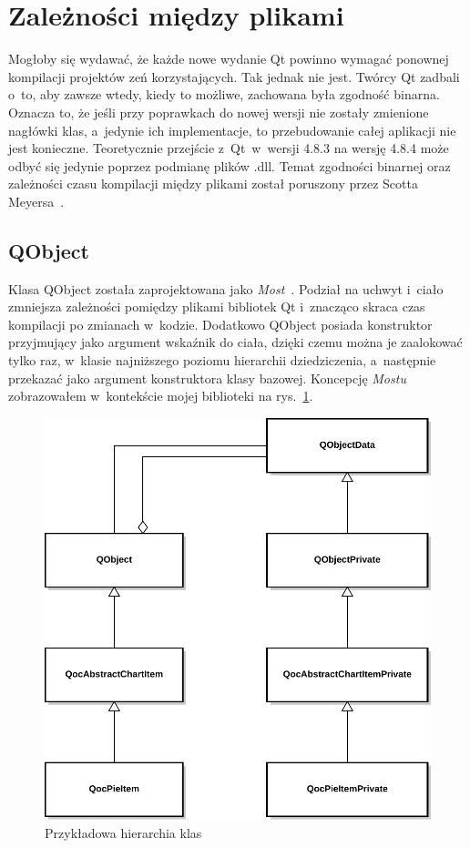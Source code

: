 \section{Zależności między plikami}
Mogłoby się wydawać, że każde nowe wydanie Qt powinno wymagać ponownej kompilacji projektów zeń korzystających. Tak jednak nie jest. Twórcy Qt zadbali o~to, aby zawsze wtedy, kiedy to możliwe, zachowana była zgodność binarna. Oznacza to, że jeśli przy poprawkach do nowej wersji nie zostały zmienione nagłówki klas, a~jedynie ich implementacje, to przebudowanie całej aplikacji nie jest konieczne. Teoretycznie przejście z~Qt~w~wersji 4.8.3 na wersję 4.8.4 może odbyć się jedynie poprzez podmianę plików .dll. Temat zgodności binarnej oraz zależności czasu kompilacji między plikami został poruszony przez Scotta Meyersa~\cite[150-158]{50Ways}.

\subsection{QObject}
Klasa QObject została zaprojektowana jako \textit{Most}~\cite[181-190]{Patterns}.
Podział na uchwyt i~ciało zmniejsza zależności pomiędzy plikami bibliotek Qt i~znacząco skraca czas kompilacji po zmianach w~kodzie. Dodatkowo QObject posiada konstruktor przyjmujący jako argument wskaźnik do ciała, dzięki czemu można je zaalokować tylko raz, w~klasie najniższego poziomu hierarchii dziedziczenia, a~następnie przekazać jako argument konstruktora klasy bazowej. 
Koncepcję \textit{Mostu} zobrazowałem w~kontekście mojej biblioteki na rys.~\ref{rys:dpointer}.\newline

\begin{figure}
\centering
\caption{Przykładowa hierarchia klas}\label{rys:dpointer}
\includegraphics[scale=0.8]{img/dpointer.pdf}
\end{figure}

